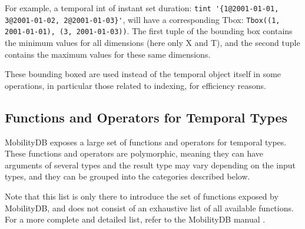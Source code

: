 For example, a temporal int of instant set duration: \lstinline+tint '{1@2001-01-01, 3@2001-01-02, 2@2001-01-03}'+, will have a corresponding Tbox: \lstinline{Tbox((1, 2001-01-01), (3, 2001-01-03))}. The first tuple of the bounding box contains the minimum values for all dimensions (here only X and T), and the second tuple contains the maximum values  for these same dimensions.

These bounding boxed are used instead of the temporal object itself in some operations, in particular those related to indexing, for efficiency reasons.

\subsection{Functions and Operators for Temporal Types}
\label{section:mobilitydb_functions}

MobilityDB exposes a large set of functions and operators for temporal types. These functions and operators are polymorphic, meaning they can have arguments of several types and the result type may vary depending on the input types, and they can be grouped into the categories described below. 

Note that this list is only there to introduce the set of functions exposed by MobilityDB, and does not consist of an exhaustive list of all available functions. For a more complete and detailed list, refer to the MobilityDB manual \cite{mobiliydb_manual}.

